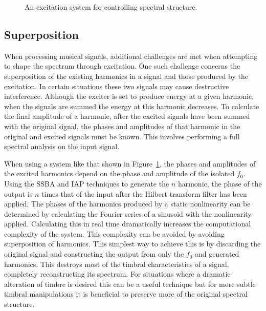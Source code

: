 \begin{figure}[h!]
			\caption{An excitation system for controlling spectral structure.}
			\label{fig:SpectralShapingSystem}
		\end{figure}

	\subsection{Superposition}
	\label{sec:FeatureControl-Systems-Superposition}
		When processing musical signals, additional challenges are met when attempting to shape the spectrum
		through excitation. One such challenge concerns the superposition of the existing harmonics in a signal and
		those produced by the excitation. In certain situations these two signals may cause destructive
		interference. Although the exciter is set to produce energy at a given harmonic, when the signals are
		summed the energy at this harmonic decreases. To calculate the final amplitude of a harmonic, after the
		excited signals have been summed with the original signal, the phases and amplitudes of that harmonic in
		the original and excited signals must be known. This involves performing a full spectral analysis on the
		input signal. 

		When using a system like that shown in Figure~\ref{fig:SpectralShapingSystem}, the phases and amplitudes of
		the excited harmonics depend on the phase and amplitude of the isolated $f_{0}$. Using the SSBA and IAP
		techniques to generate the $n$ harmonic, the phase of the output is $n$ times that of the input
		after the Hilbert transform filter has been applied. The phases of the harmonics produced by a static
		nonlinearity can be determined by calculating the Fourier series of a sinusoid with the nonlinearity
		applied. Calculating this in real time dramatically increases the computational complexity of the system.
		This complexity can be avoided by avoiding superposition of harmonics. This simplest way to achieve this is
		by discarding the original signal and constructing the output from only the $f_{0}$ and generated
		harmonics.  This destroys most of the timbral characteristics of a signal, completely reconstructing its
		spectrum. For situations where a dramatic alteration of timbre is desired this can be a useful technique
		but for more subtle timbral manipulations it is beneficial to preserve more of the original spectral
		structure.

